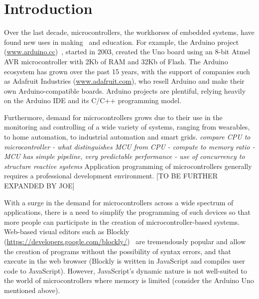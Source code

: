 \section{Introduction}
\label{sec:intro}

Over the last decade, microcontrollers, the workhorses of embedded systems, have found
new uses in making~\cite{dougherty2012maker} and education. For example, the Arduino project
(\url{www.arduino.cc})~\cite{buildingArduino2014},
started in 2003, created the Uno board using an 8-bit Atmel
AVR microcontroller with 2Kb of RAM and 32Kb of Flash. 
The Arduino ecosystem has grown over the past 15 years,
with the support of companies such as Adafruit Industries (\url{www.adafruit.com}), 
who resell Arduino and make their own Arduino-compatible boards. Arduino projects
are plentiful, relying heavily on the Arduino IDE and its C/C++ programming model.

Furthermore, demand for microcontrollers grows due to their use in the monitoring and controlling
of a wide variety of systems, ranging from wearables, to home automation, to industrial 
automation and smart grids. \emph{compare CPU to microcontroller - what distinguishes MCU from CPU - 
compute to memory ratio - MCU has simple pipeline, very predictable performance - use of concurrency
to structure reactive systems}
Application programming of microcontrollers generally requires a professional
development environment. [TO BE FURTHER EXPANDED BY JOE]

With a surge in the demand for microcontrollers across a wide
spectrum of applications, there is a need to simplify the programming 
of such devices so that more people can participate in the creation 
of microcontroller-based systems. Web-based visual editors such as 
Blockly (\url{https://developers.google.com/blockly/})~\cite{Blocky2015}
are tremendously popular and allow the creation of programs without the 
possibility of syntax errors, and that execute in the web browser (Blockly
is written in JavaScript and compiles user code to JavaScript).
However, JavaScript's dynamic nature is not well-suited to the world of 
microcontrollers where memory is limited (consider the Arduino Uno mentioned above).

